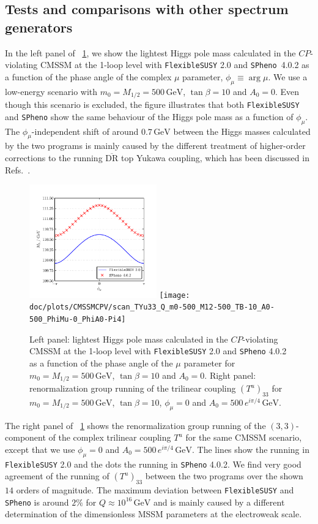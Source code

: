 \documentclass[final,3p,11pt,pdflatex]{elsarticle}
\makeatletter
\newcommand{\spheno}{\texttt{SPheno}\@\xspace}
\newcommand{\fs}{\texttt{FlexibleSUSY}\@\xspace}
\newcommand{\fstwo}{\fs 2.0\@\xspace}
\newcommand{\ol}[1]{\overline{#1}}
\newcommand{\DRbar}{\ensuremath{\ol{\text{DR}}}\xspace}
\newcommand{\unit}[1]{\,\text{#1}}      %
\newcommand{\figref}[1]{\figurename~\ref{#1}}
\newcommand{\CP}{\ensuremath{CP}\xspace}
\newcommand{\azero}{\ensuremath{A_0}\xspace}
\newcommand{\mhalf}{\ensuremath{M_{1/2}}\xspace}
\newcommand{\mzero}{\ensuremath{m_0}\xspace}
\makeatother
\begin{document}
\subsection{Tests and comparisons with other spectrum generators}
%
In the left panel of \figref{fig:CMSSMCPV_plots}, we show the lightest
Higgs pole mass calculated in the \CP-violating CMSSM at the 1-loop
level with \fstwo and \spheno~4.0.2 as a function of the phase angle
of the complex $\mu$ parameter, $\phi_\mu \equiv \arg \mu$.
We use a low-energy scenario with $\mzero = \mhalf = 500\unit{GeV}$,
$\tan\beta = 10$ and $\azero = 0$.  Even though this scenario is
excluded, the figure illustrates that both \fs and \spheno show the
same behaviour of the Higgs pole mass as a function of $\phi_\mu$.
The $\phi_\mu$-independent shift of around $0.7\unit{GeV}$ between the
Higgs masses calculated by the two programs is mainly caused by the
different treatment of higher-order corrections to
the running \DRbar top Yukawa coupling, which has been discussed in
Refs.~\cite{Staub:2015aea,ThomasKwasnitza:2016yqj}.
%
\begin{figure}[tbh]
  \centering
  \includegraphics[width=0.49\textwidth]{doc/plots/CMSSMCPV/scan_Mh_PhiMu_m0-500_M12-500_TB-10_A0-0}\hfill
  \texttt{[image: doc/plots/CMSSMCPV/scan\_TYu33\_Q\_m0-500\_M12-500\_TB-10\_A0-500\_PhiMu-0\_PhiA0-Pi4]}
  \caption{Left panel: lightest Higgs pole mass calculated in the
    \CP-violating CMSSM at the 1-loop level with \fstwo and
    \spheno 4.0.2 as a function of the phase angle of the $\mu$
    parameter for $\mzero = \mhalf = 500\unit{GeV}$, $\tan\beta = 10$
    and $\azero = 0$.  Right panel: renormalization group running of the
    trilinear coupling $(T^u)_{33}$ for $\mzero = \mhalf =
    500\unit{GeV}$, $\tan\beta = 10$, $\phi_\mu = 0$ and $\azero = 500\,
    e^{i \pi/4} \unit{GeV}$.}
  \label{fig:CMSSMCPV_plots}
\end{figure}

The right panel of \figref{fig:CMSSMCPV_plots} shows the
renormalization group running of the $(3,3)$-component of the complex
trilinear coupling $T^u$ for the same CMSSM scenario, except that we
use $\phi_\mu = 0$ and $\azero = 500\, e^{i \pi/4} \unit{GeV}$.  The
lines show the running in \fstwo and the dots the
running in \spheno 4.0.2.  We find very good agreement of
the running of $(T^u)_{33}$ between the two programs over the shown
$14$ orders of magnitude. The maximum deviation between \fs and
\spheno is around $2\%$ for $Q \approx 10^{16} \unit{GeV}$ and is
mainly caused by a different determination of the
dimensionless MSSM parameters at the electroweak scale.
\end{document}
